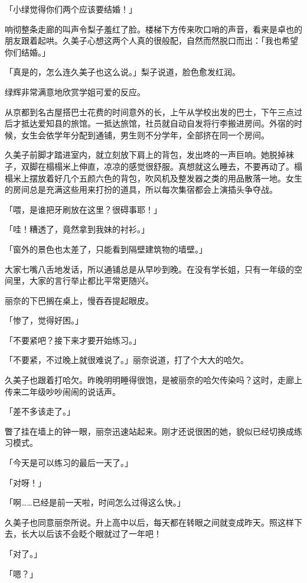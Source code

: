 \documentclass[UTF8]{ctexart}
\begin{document}
    「小绿觉得你们两个应该要结婚！」 

    响彻整条走廊的叫声令梨子羞红了脸。楼梯下方传来吹口哨的声音，看来是卓也的朋友跟着起哄。久美子心想这两个人真的很般配，自然而然脱口而出：「我也希望你们结婚。」 

    「真是的，怎么连久美子也这么说。」梨子说道，脸色愈发红润。 

    绿辉非常满意地欣赏学姐可爱的反应。 

    从京都到名古屋搭巴士花费的时间意外的长，上午从学校出发的巴士，下午三点过后才抵达爱知县的旅馆。一抵达旅馆，社员就自动自发将行李搬进房间。外宿的时候，女生会依学年分配到通铺，男生则不分学年，全部挤在同一个房间。 

    久美子前脚才踏进室内，就立刻放下肩上的背包，发出咚的一声巨响。她脱掉袜子，双脚在榻榻米上伸直，凉凉的感觉很舒服。真想就这么睡去，不要再动了。榻榻米上摆放着好几个五颜六色的背包，吹风机及整发器之类的用品散落一地。女生的房间总是充满这些用来打扮的道具，所以每次集宿都会上演插头争夺战。 

    「喂，是谁把牙刷放在这里？很碍事耶！」 

    「哇！糟透了，竟然拿到我妹的衬衫。」 

    「窗外的景色也太差了，只能看到隔壁建筑物的墙壁。」 

    大家七嘴八舌地发话，所以通铺总是从早吵到晚。在没有学长姐，只有一年级的空间里，大家的言行举止都比平常更随兴。 

    丽奈的下巴搁在桌上，慢吞吞提起眼皮。 

    「惨了，觉得好困。」 

    「不要紧吧？接下来才要开始练习。」 

    「不要紧，不过晚上就很难说了。」丽奈说道，打了个大大的哈欠。 

    久美子也跟着打哈欠。昨晚明明睡得很饱，是被丽奈的哈欠传染吗？这时，走廊上传来二年级吵吵闹闹的说话声。 

    「差不多该走了。」 

    瞥了挂在墙上的钟一眼，丽奈迅速站起来。刚才还说很困的她，貌似已经切换成练习模式。 

    「今天是可以练习的最后一天了。」 

    「对呀！」 

    「啊……已经是前一天啦，时间怎么过得这么快。」 

    久美子也同意丽奈所说。升上高中以后，每天都在转眼之间就变成昨天。照这样下去，长大以后该不会眨个眼就过了一年吧！ 

    「对了。」 

    「嗯？」 
\end{document}
